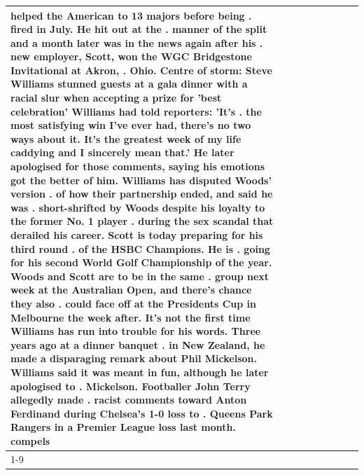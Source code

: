 \begin{table}[H]
\begin{tabular}{lllrlllll}
helped the American to 13 majors before being . fired in July. He hit out at the . manner of the split and a month later was in the news again after his . new employer, Scott, won the WGC Bridgestone Invitational at Akron, . Ohio. Centre of storm: Steve Williams stunned guests at a gala dinner with a racial slur when accepting a prize for 'best celebration' Williams had told reporters: 'It's . the most satisfying win I've ever had, there's no two ways about it. It's the greatest week of my life caddying and I sincerely mean that.' He later apologised for those comments, saying his emotions got the better of him. Williams has disputed Woods' version . of how their partnership ended, and said he was . short-shrifted by Woods despite his loyalty to the former No. 1 player . during the sex scandal that derailed his career. Scott is today preparing for his third round . of the HSBC Champions. He is . going for his second World Golf Championship of the year. Woods and Scott are to be in the same . group next week at the Australian Open, and there's chance they also . could face off at the Presidents Cup in Melbourne the week after. It's not the first time Williams has run into trouble for his words. Three years ago at a dinner banquet . in New Zealand, he made a disparaging remark about Phil Mickelson. Williams said it was meant in fun, although he later apologised to . Mickelson. Footballer John Terry allegedly made . racist comments toward Anton Ferdinand during Chelsea's 1-0 loss to . Queens Park Rangers in a Premier League loss last month. compels \\
\cline{1-9}

\end{tabular}
\end{table}
